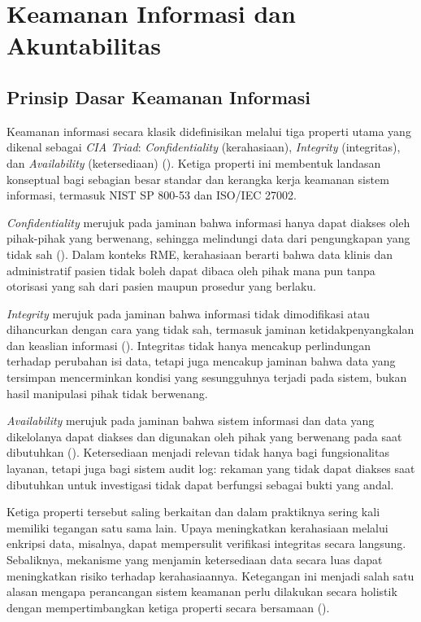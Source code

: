 \section{Keamanan Informasi dan Akuntabilitas}
\label{sec:keamanan-informasi}

\subsection{Prinsip Dasar Keamanan Informasi}
\label{subsec:prinsip-keamanan-informasi}

Keamanan informasi secara klasik didefinisikan melalui tiga properti
utama yang dikenal sebagai \textit{CIA Triad}: \textit{Confidentiality}
(kerahasiaan), \textit{Integrity} (integritas), dan \textit{Availability}
(ketersediaan) (\cite{nist80053r5}). Ketiga properti ini membentuk
landasan konseptual bagi sebagian besar standar dan kerangka kerja
keamanan sistem informasi, termasuk NIST SP 800-53 dan
ISO/IEC 27002.

\textit{Confidentiality} merujuk pada jaminan bahwa informasi hanya
dapat diakses oleh pihak-pihak yang berwenang, sehingga melindungi
data dari pengungkapan yang tidak sah (\cite{nist80053r5}). Dalam
konteks RME, kerahasiaan berarti bahwa data klinis dan administratif
pasien tidak boleh dapat dibaca oleh pihak mana pun tanpa otorisasi
yang sah dari pasien maupun prosedur yang berlaku.

\textit{Integrity} merujuk pada jaminan bahwa informasi tidak
dimodifikasi atau dihancurkan dengan cara yang tidak sah, termasuk
jaminan ketidakpenyangkalan dan keaslian informasi
(\cite{nist80053r5}). Integritas tidak hanya mencakup perlindungan
terhadap perubahan isi data, tetapi juga mencakup jaminan bahwa data
yang tersimpan mencerminkan kondisi yang sesungguhnya terjadi pada
sistem, bukan hasil manipulasi pihak tidak berwenang.

\textit{Availability} merujuk pada jaminan bahwa sistem informasi dan
data yang dikelolanya dapat diakses dan digunakan oleh pihak yang
berwenang pada saat dibutuhkan (\cite{nist80053r5}). Ketersediaan
menjadi relevan tidak hanya bagi fungsionalitas layanan, tetapi juga
bagi sistem audit log: rekaman yang tidak dapat diakses saat dibutuhkan
untuk investigasi tidak dapat berfungsi sebagai bukti yang andal.

Ketiga properti tersebut saling berkaitan dan dalam praktiknya sering
kali memiliki tegangan satu sama lain. Upaya meningkatkan kerahasiaan
melalui enkripsi data, misalnya, dapat mempersulit verifikasi
integritas secara langsung. Sebaliknya, mekanisme yang menjamin
ketersediaan data secara luas dapat meningkatkan risiko terhadap
kerahasiaannya. Ketegangan ini menjadi salah satu alasan mengapa
perancangan sistem keamanan perlu dilakukan secara holistik dengan
mempertimbangkan ketiga properti secara bersamaan (\cite{shostack2014}).

